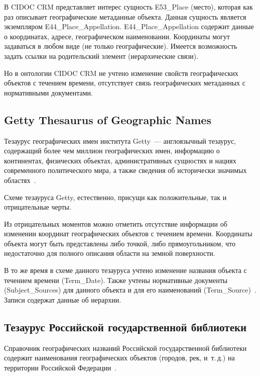 \begin{multicols}{2}
  В {CIDOC CRM} представляет интерес сущность {E53\_Place} (место), которая 
как раз описывает географические метаданные объекта. Данная сущность является 
экземпляром {E44\_Place\_Appellation}. {E44\_Place\_Appellation} содержит данные 
о координатах, адресе, географическом наименовании. Координаты могут задаваться в 
любом виде (не только географические). Имеется возможность задать ссылки на 
родительский элемент (иерархические связи).
  
  Но в онтологии {CIDOC CRM} не учтено изменение свойств географических 
объектов с течением времени, отсутствует связь географических метаданных с 
нормативными документами.

   \vspace*{-6pt}
  
  \subsection{{Getty Thesaurus of Geographic Names}}
  
  Тезаурус географических имен института {Getty}~--- англоязычный тезаурус, 
содержащий более чем миллион географических имен, информацию о континентах, 
физических объектах, административных сущностях и нациях современного политического 
мира, а также сведения об исторически значимых областях~\cite{7-sk}.
  
  Схеме тезауруса {Getty}, естественно, присущи как положительные, так и 
отрицательные черты.
  
  Из отрицательных моментов можно отметить отсутствие информации об изменении 
координат географических объектов с течением времени. Координаты объекта могут быть 
представлены либо точкой, либо прямоугольником, что недостаточно для полного описания 
области на земной поверхности.
  
  В то же время в схеме данного тезауруса учтено изменение названия объекта с течением 
времени ({Term\_Date}). Также учтены нормативные документы 
({Subject\_Sources}) для данного объекта и для его наименований 
({Term\_Source})~\cite{8-sk}. Записи содержат данные об иерархии.
  
  \subsection{Тезаурус Российской государственной библиотеки}
  
  Справочник географических названий Российской государственной библиотеки 
содержит наименования географических объектов (городов, рек, и~т.\,д.) на территории 
Российской Федерации~\cite{9-sk, 10-sk}.
  

\end{multicols}
